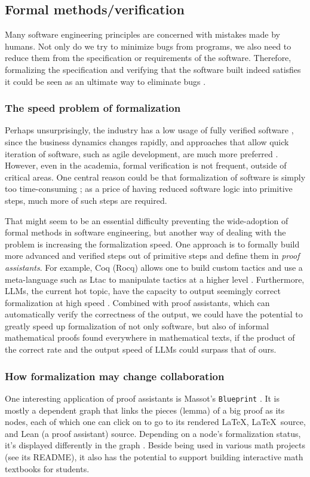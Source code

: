 \documentclass[10pt]{article}
\begin{document}
\subsection{Formal methods/verification}
Many software engineering principles are concerned with mistakes made by
humans. Not only do we try to minimize bugs from programs, we also need to
reduce them from the specification or requirements of the software.  Therefore,
formalizing the specification and verifying that the software built indeed
satisfies it could be seen as an ultimate way to eliminate bugs
\cite{hoare.axiomatic.prog}. 

\subsubsection{The speed problem of formalization} \label{sec.speed.formal}
Perhaps unsurprisingly, the industry has a low usage of fully verified software
\cite{formal.methods.underuse}, since the business dynamics changes rapidly,
and approaches that allow quick iteration of software, such as agile
development, are much more preferred \cite{agile.se}. However, even in the
academia, formal verification is not frequent, outside of critical areas. One
central reason could be that formalization of software is simply too
time-consuming \cite{formal.methods.underuse}; as a price of having reduced
software logic into primitive steps, much more of such steps are required.

That might seem to be an essential difficulty preventing the wide-adoption of
formal methods in software engineering, but another way of dealing with the
problem is increasing the formalization speed. One approach is to formally build
more advanced and verified steps out of primitive steps and define them in
\emph{proof assistants}. For example, Coq (Rocq) allows one to build custom
tactics and use a meta-language such as Ltac to manipulate tactics at a higher
level \cite{coq.manual}. Furthermore, LLMs, the current hot topic, have the
capacity to output seemingly correct formalization at high speed
\cite{llm.gen.proof}.  Combined with proof assistants, which can automatically
verify the correctness of the output, we could have the potential to greatly
speed up formalization of not only software, but also of informal mathematical
proofs found everywhere in mathematical texts, if the product of the correct
rate and the output speed of LLMs could surpass that of ours.

\subsubsection{How formalization may change collaboration}
One interesting application of proof assistants is Massot's \texttt{Blueprint}
\cite{massot.blueprint}. It is mostly a dependent graph that links the pieces
(lemma) of a big proof as its nodes, each of which one can click on to go to
its rendered \LaTeX, \LaTeX\ source, and Lean (a proof assistant) source.
Depending on a node's formalization status, it's displayed differently in the
graph \cite{tao.blueprint.post}. Beside being used in various math projects
(see its README), it also has the potential to support building interactive
math textbooks for students.
\end{document}
